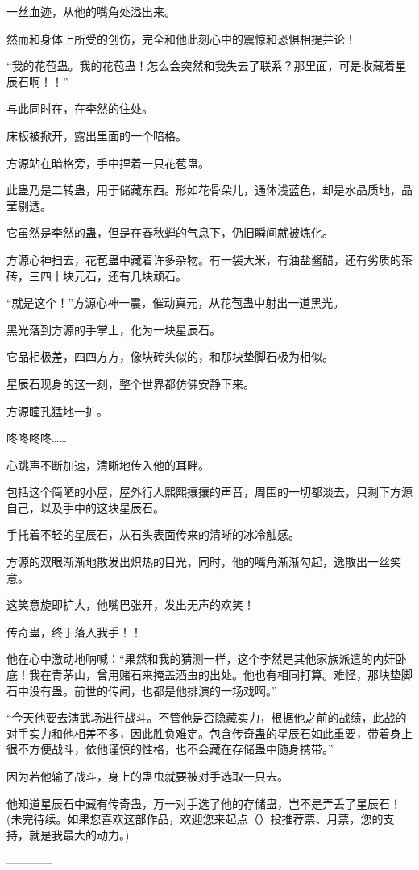 \begin{this_body}
一丝血迹，从他的嘴角处溢出来。

然而和身体上所受的创伤，完全和他此刻心中的震惊和恐惧相提并论！

“我的花苞蛊。我的花苞蛊！怎么会突然和我失去了联系？那里面，可是收藏着星辰石啊！！”

与此同时在，在李然的住处。

床板被掀开，露出里面的一个暗格。

方源站在暗格旁，手中捏着一只花苞蛊。

此蛊乃是二转蛊，用于储藏东西。形如花骨朵儿，通体浅蓝色，却是水晶质地，晶莹剔透。

它虽然是李然的蛊，但是在春秋蝉的气息下，仍旧瞬间就被炼化。

方源心神扫去，花苞蛊中藏着许多杂物。有一袋大米，有油盐酱醋，还有劣质的茶砖，三四十块元石，还有几块顽石。

“就是这个！”方源心神一震，催动真元，从花苞蛊中射出一道黑光。

黑光落到方源的手掌上，化为一块星辰石。

它品相极差，四四方方，像块砖头似的，和那块垫脚石极为相似。

星辰石现身的这一刻，整个世界都仿佛安静下来。

方源瞳孔猛地一扩。

咚咚咚咚……

心跳声不断加速，清晰地传入他的耳畔。

包括这个简陋的小屋，屋外行人熙熙攘攘的声音，周围的一切都淡去，只剩下方源自己，以及手中的这块星辰石。

手托着不轻的星辰石，从石头表面传来的清晰的冰冷触感。

方源的双眼渐渐地散发出炽热的目光，同时，他的嘴角渐渐勾起，逸散出一丝笑意。

这笑意旋即扩大，他嘴巴张开，发出无声的欢笑！

传奇蛊，终于落入我手！！

他在心中激动地呐喊：“果然和我的猜测一样，这个李然是其他家族派遣的内奸卧底！我在青茅山，曾用赌石来掩盖酒虫的出处。他也有相同打算。难怪，那块垫脚石中没有蛊。前世的传闻，也都是他排演的一场戏啊。”

“今天他要去演武场进行战斗。不管他是否隐藏实力，根据他之前的战绩，此战的对手实力和他相差不多，因此胜负难定。包含传奇蛊的星辰石如此重要，带着身上很不方便战斗，依他谨慎的性格，也不会藏在存储蛊中随身携带。”

因为若他输了战斗，身上的蛊虫就要被对手选取一只去。

他知道星辰石中藏有传奇蛊，万一对手选了他的存储蛊，岂不是弄丢了星辰石！(未完待续。如果您喜欢这部作品，欢迎您来起点（）投推荐票、月票，您的支持，就是我最大的动力。)

------------

\end{this_body}


